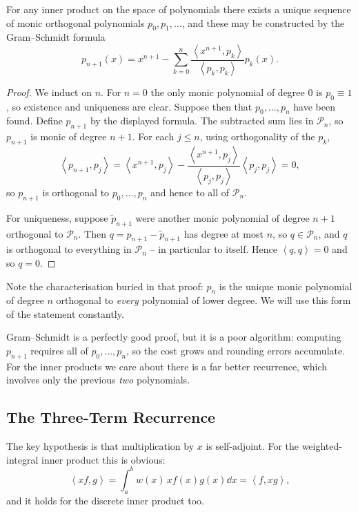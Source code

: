 \documentclass[a4paper]{scrartcl}
\newcommand{\ip}[2]{\left\langle #1, #2 \right\rangle}
\newcommand{\Pn}[1]{\mathcal{P}_{#1}}
\begin{document}
\begin{theorem}\label{thm:opexist}
  For any inner product on the space of polynomials there exists a unique sequence of monic orthogonal polynomials $p_0, p_1, \dots$, and these may be constructed by the Gram--Schmidt formula
  $$
  p_{n+1}(x) = x^{n+1} - \sum_{k=0}^{n}\frac{\ip{x^{n+1}}{p_k}}{\ip{p_k}{p_k}}p_k(x).
  $$
\end{theorem}
\begin{proof}
  We induct on $n$. For $n = 0$ the only monic polynomial of degree $0$ is $p_0 \equiv 1$, so existence and uniqueness are clear. Suppose then that $p_0, \dots, p_n$ have been found. Define $p_{n+1}$ by the displayed formula. The subtracted sum lies in $\Pn{n}$, so $p_{n+1}$ is monic of degree $n+1$. For each $j \leq n$, using orthogonality of the $p_k$,
  $$
  \ip{p_{n+1}}{p_j} = \ip{x^{n+1}}{p_j} - \frac{\ip{x^{n+1}}{p_j}}{\ip{p_j}{p_j}}\ip{p_j}{p_j} = 0,
  $$
  so $p_{n+1}$ is orthogonal to $p_0, \dots, p_n$ and hence to all of $\Pn{n}$.

  For uniqueness, suppose $\tilde p_{n+1}$ were another monic polynomial of degree $n+1$ orthogonal to $\Pn{n}$. Then $q = p_{n+1} - \tilde p_{n+1}$ has degree at most $n$, so $q \in \Pn{n}$, and $q$ is orthogonal to everything in $\Pn{n}$ -- in particular to itself. Hence $\ip{q}{q} = 0$ and so $q = 0$.
\end{proof}

\begin{remark}
  Note the characterisation buried in that proof: $p_n$ is the unique monic polynomial of degree $n$ orthogonal to \emph{every} polynomial of lower degree. We will use this form of the statement constantly.
\end{remark}

Gram--Schmidt is a perfectly good proof, but it is a poor algorithm: computing $p_{n+1}$ requires all of $p_0, \dots, p_n$, so the cost grows and rounding errors accumulate. For the inner products we care about there is a far better recurrence, which involves only the previous \emph{two} polynomials.

\subsection{The Three-Term Recurrence}

The key hypothesis is that multiplication by $x$ is self-adjoint. For the weighted-integral inner product this is obvious:
$$
\ip{xf}{g} = \int_a^b w(x)\, x f(x) g(x) \dd x = \ip{f}{xg},
$$
and it holds for the discrete inner product too.
\end{document}

